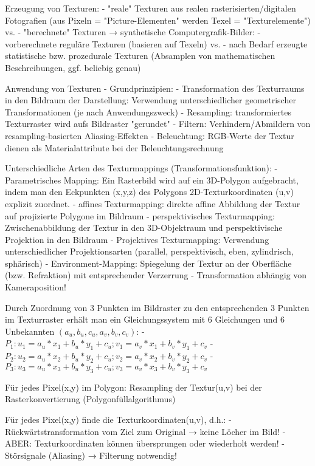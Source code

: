 \documentclass[10pt,landscape]{article}
\begin{document}
\begin{multicols}{3}
Erzeugung von Texturen:
- "reale" Texturen aus realen rasterisierten/digitalen Fotografien (aus Pixeln = "Picture-Elementen" werden Texel = "Texturelemente") vs.
- "berechnete" Texturen → synthetische Computergrafik-Bilder:
  - vorberechnete reguläre Texturen (basieren auf Texeln) vs.
  - nach Bedarf erzeugte statistische bzw. prozedurale Texturen (Absamplen von mathematischen Beschreibungen, ggf. beliebig genau)

Anwendung von Texturen - Grundprinzipien:
- Transformation des Texturraums in den Bildraum der Darstellung: Verwendung unterschiedlicher geometrischer Transformationen (je nach Anwendungszweck)
- Resampling: transformiertes Texturraster wird aufs Bildraster "gerundet"
- Filtern: Verhindern/Abmildern von resampling-basierten Aliasing-Effekten
- Beleuchtung: RGB-Werte der Textur dienen als Materialattribute bei der Beleuchtungsrechnung
  
Unterschiedliche Arten des Texturmappings (Transformationsfunktion):
- Parametrisches Mapping: Ein Rasterbild wird auf ein 3D-Polygon aufgebracht, indem man den Eckpunkten (x,y,z) des Polygons 2D-Texturkoordinaten (u,v) explizit zuordnet.
  - affines Texturmapping: direkte affine Abbildung der Textur auf projizierte Polygone im Bildraum
  - perspektivisches Texturmapping: Zwischenabbildung der Textur in den 3D-Objektraum und perspektivische Projektion in den Bildraum
- Projektives Texturmapping: Verwendung unterschiedlicher Projektionsarten (parallel, perspektivisch, eben, zylindrisch, sphärisch)
- Environment-Mapping: Spiegelung der Textur an der Oberfläche (bzw. Refraktion) mit entsprechender Verzerrung
  - Transformation abhängig von Kameraposition!

Durch Zuordnung von 3 Punkten im Bildraster zu den entsprechenden 3 Punkten im Texturraster erhält man ein Gleichungssystem mit 6 Gleichungen und 6 Unbekannten $(a_u , b_u , c_u , a_v , b_v , c_v )$:
- $P_1: u_1=a_u*x_1+b_u*y_1+c_u; v_1=a_v*x_1+b_v*y_1+c_v$
- $P_2: u_2=a_u*x_2+b_u*y_2+c_u; v_2=a_v*x_2+b_v*y_2+c_v$
- $P_3: u_3=a_u*x_3+b_u*y_3+c_u; v_3=a_v*x_3+b_v*y_3+c_v$

Für jedes Pixel(x,y) im Polygon: Resampling der Textur(u,v) bei der Rasterkonvertierung (Polygonfüllalgorithmus)

Für jedes Pixel(x,y) finde die Texturkoordinaten(u,v), d.h.:
- Rückwärtstransformation vom Ziel zum Original → keine Löcher im Bild!
- ABER: Texturkoordinaten können übersprungen oder wiederholt werden!
- Störsignale (Aliasing) → Filterung notwendig!


\end{multicols}
\end{document}
